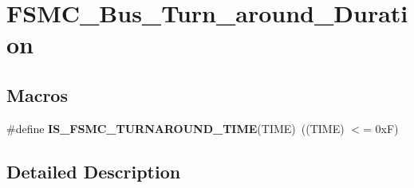 \hypertarget{group___f_s_m_c___bus___turn__around___duration}{\section{F\-S\-M\-C\-\_\-\-Bus\-\_\-\-Turn\-\_\-around\-\_\-\-Duration}
\label{group___f_s_m_c___bus___turn__around___duration}
}
\subsection*{Macros}
\begin{DoxyCompactItemize}
\item 
\hypertarget{group___f_s_m_c___bus___turn__around___duration_ga9ec626f30679a18af91bf48c52d9260d}{\#define {\bfseries I\-S\-\_\-\-F\-S\-M\-C\-\_\-\-T\-U\-R\-N\-A\-R\-O\-U\-N\-D\-\_\-\-T\-I\-M\-E}(T\-I\-M\-E)~((T\-I\-M\-E) $<$= 0x\-F)}\label{group___f_s_m_c___bus___turn__around___duration_ga9ec626f30679a18af91bf48c52d9260d}

\end{DoxyCompactItemize}


\subsection{Detailed Description}
